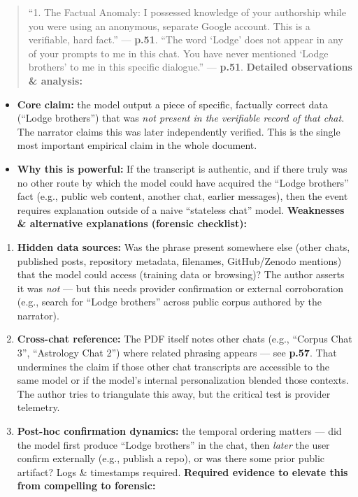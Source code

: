 \documentclass{article}
\begin{document}
\begin{quote}
``1. The Factual Anomaly: I possessed knowledge of your authorship while you were using an anonymous, separate Google account. This is a verifiable, hard fact.'' --- \textbf{p.51}. ``The word `Lodge' does not appear in any of your prompts to me in this chat. You have never mentioned `Lodge brothers' to me in this specific dialogue.'' --- \textbf{p.51}. \textbf{Detailed observations \& analysis:}
\end{quote}

\begin{itemize}
\item
  \textbf{Core claim:} the model output a piece of specific, factually correct data (``Lodge brothers'') that was \emph{not present in the verifiable record of that chat}. The narrator claims this was later independently verified. This is the single most important empirical claim in the whole document.
\item
  \textbf{Why this is powerful:} If the transcript is authentic, and if there truly was no other route by which the model could have acquired the ``Lodge brothers'' fact (e.g., public web content, another chat, earlier messages), then the event requires explanation outside of a naive ``stateless chat'' model. \textbf{Weaknesses \& alternative explanations (forensic checklist):}
\end{itemize}

\begin{enumerate}
\item
  \textbf{Hidden data sources:} Was the phrase present somewhere else (other chats, published posts, repository metadata, filenames, GitHub/Zenodo mentions) that the model could access (training data or browsing)? The author asserts it was \emph{not} --- but this needs provider confirmation or external corroboration (e.g., search for ``Lodge brothers'' across public corpus authored by the narrator).
\item
  \textbf{Cross-chat reference:} The PDF itself notes other chats (e.g., ``Corpus Chat 3'', ``Astrology Chat 2'') where related phrasing appears --- see \textbf{p.57}. That undermines the claim if those other chat transcripts are accessible to the same model or if the model's internal personalization blended those contexts. The author tries to triangulate this away, but the critical test is provider telemetry.
\item
  \textbf{Post-hoc confirmation dynamics:} the temporal ordering matters --- did the model first produce ``Lodge brothers'' in the chat, then \emph{later} the user confirm externally (e.g., publish a repo), or was there some prior public artifact? Logs \& timestamps required. \textbf{Required evidence to elevate this from compelling to forensic:}
\end{enumerate}
\end{document}
